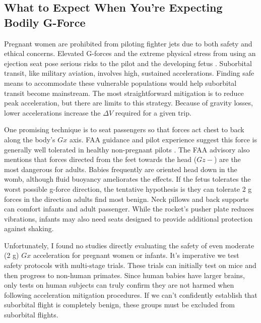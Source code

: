 \documentclass{article}
\begin{document}
{\subsection{What to Expect When You're Expecting Bodily G-Force}\label{sec:pregnant_women}\cite{expecting_pregnancy_book}
Pregnant women are prohibited from piloting fighter jets due to both safety and ethical concerns. Elevated G-forces and the extreme physical stress from using an ejection seat pose serious risks to the pilot and the developing fetus \cite{pregnancy_gforce_risk}. Suborbital transit, like military aviation, involves high, sustained accelerations.  Finding safe means to accommodate these vulnerable populations would help suborbital transit become mainstream.  The most straightforward mitigation is to reduce peak acceleration, but there are limits to this strategy.  Because of gravity losses, lower accelerations increase the $\Delta V$ required for a given trip.  

One promising technique is to seat passengers so that forces act chest to back along the body’s $Gx$ axis.   FAA guidance and pilot experience suggest this  force is generally well tolerated in healthy non-pregnant pilots \cite{lateral_acceleration}.  The FAA advisory also mentions that forces directed from the feet towards the head ($Gz-$) are the most dangerous for adults.   Babies frequently are oriented head down in the womb, although fluid buoyancy ameliorates the effects.    If the fetus tolerates the worst possible g-force direction, the tentative hypothesis is they can tolerate 2 g forces in the direction adults find most benign.  Neck pillows and back supports can comfort infants and adult passenger.  While the rocket's pusher plate reduces vibrations, infants may also need seats designed to provide additional protection against shaking.

Unfortunately, I found no studies directly evaluating the safety of even moderate (2 g) $Gx$ acceleration for pregnant women or infants. It's imperative we test safety protocols with  multi-stage trials.   These trials can initially test on mice and then progress to non-human primates.  Since human babies have larger brains, only tests on human subjects can truly confirm they are not harmed when following acceleration mitigation procedures.  If we can't confidently establish that suborbital flight is completely benign, these groups must be excluded from suborbital flights.  

}
\end{document}
